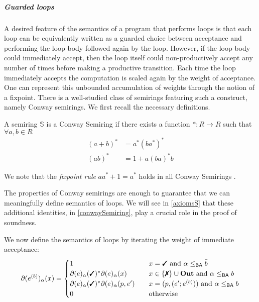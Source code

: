 \documentclass[a4paper,UKenglish,cleveref, autoref, thm-restate]{lipics-v2021}
\newcommand{\cmark}{\text{\ding{51}}}
\newcommand{\xmark}{\text{\ding{55}}}
\newcommand{\Out}{\textbf{\upshape{Out}}}
\newcommand{\BA}{\textsf{BA}}
\theoremstyle{plain}\newtheoremrep{thm}{Theorem}[section]
\begin{document}
	\subparagraph*{Guarded loops} A desired feature of the semantics of a program that performs loops is that each loop can be equivalently written as a guarded choice between acceptance and performing the loop body followed again by the loop. However, if the loop body could immediately accept, then the loop itself could non-productively accept any number of times before making a productive transition. 
	Each time the loop immediately accepts the computation is scaled again by the weight of acceptance. One can represent this unbounded accumulation of weights through the notion of a fixpoint. There is a well-studied class of semirings featuring such a construct, namely Conway semirings. We first recall the necessary definitions.
	 
	\begin{defn}
		A semiring $\mathbb S$ is a Conway Semiring if there exists a function $*:R \to R$ such that $\forall a,b \in R$\label{conwaySemiring}
		\begin{align}
				(a+b)^* &= a^*(ba^*)^* \label{denesting}\\
				(ab)^* &= 1+a(ba)^*b \label{ax2}
		\end{align}
	\end{defn} 
		
	We note that the  \emph{fixpoint rule} $aa^* +1 = a^*$ holds in all Conway Semirings  \cite[p.~6]{IterationSemirings}. 
		
	The properties of Conway semirings are enough to guarantee that we can meaningfully define semantics of loops.  We will see in \cref{axiomsS} that these additional identities,  in \cref{conwaySemiring},  play a crucial role in the proof of soundness.
	
	We now define the semantics of loops by iterating the weight of immediate acceptance: 
	$$
		\partial(e^{(b)})_\alpha(x) = 
		\begin{cases}
			1 &\quad x = \cmark \text{ and } \alpha \leq_{\BA} \bar b\\
			\partial(e)_\alpha(\cmark)^{*}\partial(e)_\alpha(x)&\quad x\in \{\xmark\} \cup \Out \text{ and } \alpha \leq_{\BA} b\\
			\partial(e)_\alpha(\cmark)^{*}\partial(e)_\alpha(p, e^\prime)&\quad x=(p, (e^\prime;e^{(b)})) \text{ and } \alpha \leq_{\BA} b\\
			0&\quad \text{otherwise}
		\end{cases}
	$$
	
\end{document}
